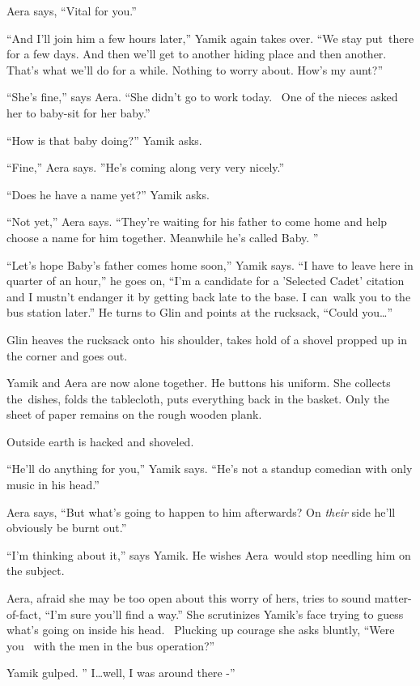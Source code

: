 \documentclass[twoside,11pt]{book}
\begin{document}
Aera says, ``Vital for you.''

``And I'll join him a few hours later,'' Yamik again takes over. ``We stay
put~there for a few days. And then we'll get to another hiding place and then another. That's what we'll do for a
while. Nothing to worry about. How's my aunt?''

``She's fine,'' says Aera. ``She didn't go to work today.~ One of the nieces
asked her to baby-sit for her baby.''

``How is that baby doing?'' Yamik asks.

``Fine,'' Aera says. ''He's coming along very very nicely.''

``Does he have a name yet?'' Yamik asks.

``Not yet,'' Aera says. ``They're waiting for his father to come home and help
choose a name for him together. Meanwhile{ }he's called Baby. ''

``Let's hope Baby's father comes home soon,'' Yamik says. ``I have to leave here
in quarter of an hour,'' he goes on, ``I'm a candidate for a 'Selected Cadet' citation and I mustn't endanger it by
getting back late to the base. I can~walk you to the bus station later.'' He turns to Glin and points at
the rucksack, ``Could you{\dots}''

Glin heaves the rucksack onto~his shoulder, takes hold of a shovel{ }propped up
in the corner and goes out.

Yamik and Aera are now alone together. He buttons his uniform. She collects the~dishes, folds the tablecloth, puts
everything back in the basket. Only the sheet of paper remains on the rough wooden plank.

Outside{ }earth{ }is hacked and shoveled.

``He'll do anything for you,'' Yamik says. ``He's not a standup comedian
with{ }only music in his head.''

Aera says, ``But what's going to happen to him afterwards? On \textit{their} side he'll obviously be burnt
out.''

``I'm thinking about it,'' says Yamik. He wishes
Aera~would{ }stop needling him on the subject.

Aera, afraid she may be too open about this worry of hers, tries to sound matter-of-fact, ``I'm sure you'll
find a way.'' She scrutinizes Yamik's face trying to guess what's going on inside his head. \ Plucking up
courage she asks bluntly, ``Were you \ with the men in the bus operation?''

Yamik gulped. '' I{\dots}well, I was around there -''
\end{document}
